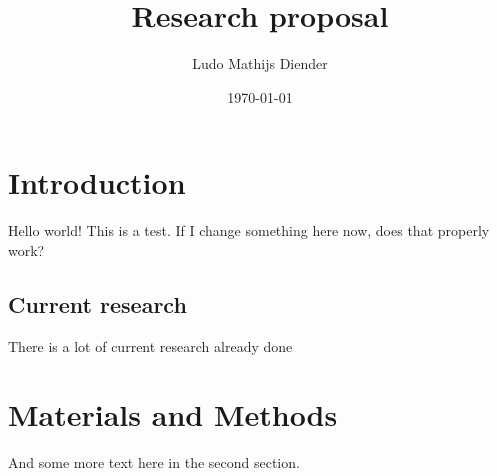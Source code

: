 \documentclass{report}
\title{Research proposal}
\author{Ludo Mathijs Diender}
\date{\today}
\begin{document}
	\maketitle
	\chapter{Introduction}

	Hello world! This is a test. If I change something here now, does that properly work?
	\section{Current research}
	There is a lot of current research already done
	
	\chapter{Materials and Methods}
	And some more text here in the second section.
\end{document}
